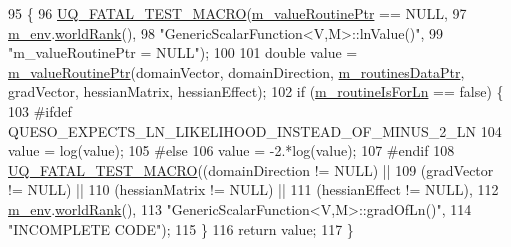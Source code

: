 \begin{DoxyCode}
95 \{
96   \hyperlink{_defines_8h_a56d63d18d0a6d45757de47fcc06f574d}{UQ\_FATAL\_TEST\_MACRO}(\hyperlink{class_q_u_e_s_o_1_1_generic_scalar_function_a9feaa5ee6ceb321fde56c5dd4dc48f2f}{m\_valueRoutinePtr} == NULL,
97                       \hyperlink{class_q_u_e_s_o_1_1_base_scalar_function_adf44141aeb765d97613286f88f235f04}{m\_env}.\hyperlink{class_q_u_e_s_o_1_1_base_environment_a78b57112bbd0e6dd0e8afec00b40ffa7}{worldRank}(),
98                       \textcolor{stringliteral}{"GenericScalarFunction<V,M>::lnValue()"},
99                       \textcolor{stringliteral}{"m\_valueRoutinePtr = NULL"});
100 
101   \textcolor{keywordtype}{double} value = \hyperlink{class_q_u_e_s_o_1_1_generic_scalar_function_a9feaa5ee6ceb321fde56c5dd4dc48f2f}{m\_valueRoutinePtr}(domainVector, domainDirection, 
      \hyperlink{class_q_u_e_s_o_1_1_generic_scalar_function_a46b2964caebcd2e22f913f86798bdf36}{m\_routinesDataPtr}, gradVector, hessianMatrix, hessianEffect);
102   \textcolor{keywordflow}{if} (\hyperlink{class_q_u_e_s_o_1_1_generic_scalar_function_a22e044d791d578453734356587bd7e65}{m\_routineIsForLn} == \textcolor{keyword}{false}) \{
103 \textcolor{preprocessor}{#ifdef QUESO\_EXPECTS\_LN\_LIKELIHOOD\_INSTEAD\_OF\_MINUS\_2\_LN}
104 \textcolor{preprocessor}{}    value = log(value);
105 \textcolor{preprocessor}{#else}
106 \textcolor{preprocessor}{}    value = -2.*log(value);
107 \textcolor{preprocessor}{#endif}
108 \textcolor{preprocessor}{}    \hyperlink{_defines_8h_a56d63d18d0a6d45757de47fcc06f574d}{UQ\_FATAL\_TEST\_MACRO}((domainDirection != NULL) ||
109                         (gradVector      != NULL) ||
110                         (hessianMatrix   != NULL) ||
111                         (hessianEffect   != NULL),
112                         \hyperlink{class_q_u_e_s_o_1_1_base_scalar_function_adf44141aeb765d97613286f88f235f04}{m\_env}.\hyperlink{class_q_u_e_s_o_1_1_base_environment_a78b57112bbd0e6dd0e8afec00b40ffa7}{worldRank}(),
113                         \textcolor{stringliteral}{"GenericScalarFunction<V,M>::gradOfLn()"},
114                         \textcolor{stringliteral}{"INCOMPLETE CODE"});
115   \}
116   \textcolor{keywordflow}{return} value;
117 \}
\end{DoxyCode}


